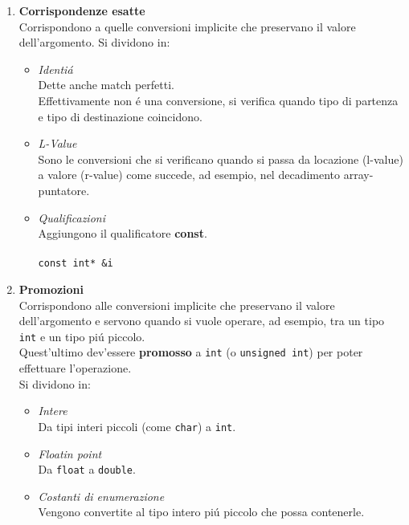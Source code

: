 \documentclass{article}
\begin{document}
\begin{enumerate}
\item \textbf{Corrispondenze esatte}\\Corrispondono a quelle conversioni implicite che preservano il valore dell'argomento. Si dividono in: \\
\begin{itemize}
\item \textit{Identi\'a}\\Dette anche match perfetti.\\ Effettivamente non \'e una conversione, si verifica quando tipo di partenza e tipo di destinazione coincidono.\\
\item \textit{L-Value}\\Sono le conversioni che si verificano quando si passa da locazione (l-value) a valore (r-value) come succede, ad esempio, nel decadimento array-puntatore.\\
\item \textit{Qualificazioni}\\Aggiungono il qualificatore \textbf{const}.\\ \\ \texttt{const int* \&i} \\
\end{itemize}
\item \textbf{Promozioni}\\Corrispondono alle conversioni implicite che preservano il valore dell'argomento e servono quando si vuole operare, ad esempio, tra un tipo \texttt{int} e un tipo pi\'u piccolo.\\ Quest'ultimo dev'essere \textbf{promosso} a \texttt{int} (o \texttt{unsigned int}) per poter effettuare l'operazione.\\Si dividono in:\\
\begin{itemize}
\item \textit{Intere}\\Da tipi interi piccoli (come \texttt{char}) a \texttt{int}.\\
\item \textit{Floatin point}\\Da \texttt{float} a \texttt{double}.\\
\item \textit{Costanti di enumerazione}\\Vengono convertite al tipo intero pi\'u piccolo che possa contenerle.\\
\end{itemize}

\end{enumerate}
\end{document}
